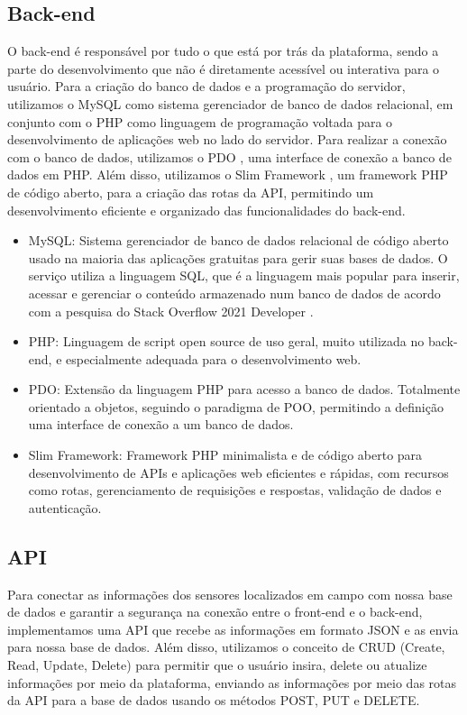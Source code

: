\documentclass[tcc,capa]{texufpel}
\begin{document}
\subsection{Back-end}
O back-end é responsável por tudo o que está por trás da plataforma, sendo a parte do desenvolvimento que não é diretamente acessível ou interativa para o usuário. Para a criação do banco de dados e a programação do servidor, utilizamos o MySQL \cite{mysql:2022} como sistema gerenciador de banco de dados relacional, em conjunto com o PHP \cite{PHP:2022} como linguagem de programação voltada para o desenvolvimento de aplicações web no lado do servidor. Para realizar a conexão com o banco de dados, utilizamos o PDO \cite{PDO:2022}, uma interface de conexão a banco de dados em PHP. Além disso, utilizamos o Slim Framework \cite{slim:2023}, um framework PHP de código aberto, para a criação das rotas da API, permitindo um desenvolvimento eficiente e organizado das funcionalidades do back-end.
\begin{itemize}
    \item MySQL: Sistema gerenciador de banco de dados relacional de código aberto usado na maioria das aplicações gratuitas para gerir suas bases de dados. O serviço utiliza a linguagem SQL, que é a linguagem mais popular para inserir, acessar e gerenciar o conteúdo armazenado num banco de dados de acordo com a pesquisa do Stack Overflow 2021 Developer \cite{stackoverflow:2022}. 
    \item PHP: Linguagem de script open source de uso geral, muito utilizada no back-end, e especialmente adequada para o desenvolvimento web. 
    \item PDO: Extensão da linguagem PHP para acesso a banco de dados. Totalmente orientado a objetos, seguindo o paradigma de POO, permitindo a definição uma interface de conexão a um banco de dados.
    \item Slim Framework: Framework PHP minimalista e de código aberto para desenvolvimento de APIs e aplicações web eficientes e rápidas, com recursos como rotas, gerenciamento de requisições e respostas, validação de dados e autenticação.
\end{itemize}
\subsection{API}
Para conectar as informações dos sensores localizados em campo com nossa base de dados e garantir a segurança na conexão entre o front-end e o back-end, implementamos uma API que recebe as informações em formato JSON e as envia para nossa base de dados. Além disso, utilizamos o conceito de CRUD (Create, Read, Update, Delete) para permitir que o usuário insira, delete ou atualize informações por meio da plataforma, enviando as informações por meio das rotas da API para a base de dados usando os métodos POST, PUT e DELETE.
\end{document}
